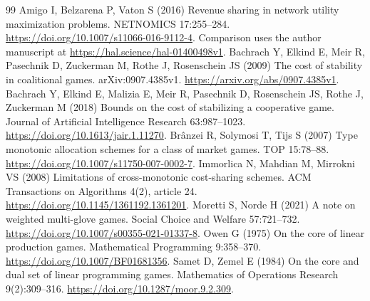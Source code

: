 \documentclass[11pt]{article}
\theoremstyle{definition}\newtheorem{definition}[theorem]{Definition}
\theoremstyle{remark}\newtheorem{remark}[theorem]{Remark}
\begin{document}
\begin{thebibliography}{99}
Amigo I, Belzarena P, Vaton S (2016) Revenue sharing in network utility
maximization problems. NETNOMICS 17:255--284.
\url{https://doi.org/10.1007/s11066-016-9112-4}.
Comparison uses the author manuscript at \url{https://hal.science/hal-01400498v1}.
Bachrach Y, Elkind E, Meir R, Pasechnik D, Zuckerman M, Rothe J,
Rosenschein JS (2009) The cost of stability in coalitional games.
arXiv:0907.4385v1. \url{https://arxiv.org/abs/0907.4385v1}.
Bachrach Y, Elkind E, Malizia E, Meir R, Pasechnik D, Rosenschein JS,
Rothe J, Zuckerman M (2018) Bounds on the cost of stabilizing a cooperative
game. Journal of Artificial Intelligence Research 63:987--1023.
\url{https://doi.org/10.1613/jair.1.11270}.
Br\^anzei R, Solymosi T, Tijs S (2007) Type monotonic allocation schemes
for a class of market games. TOP 15:78--88.
\url{https://doi.org/10.1007/s11750-007-0002-7}.
Immorlica N, Mahdian M, Mirrokni VS (2008) Limitations of cross-monotonic
cost-sharing schemes. ACM Transactions on Algorithms 4(2), article 24.
\url{https://doi.org/10.1145/1361192.1361201}.
Moretti S, Norde H (2021) A note on weighted multi-glove games.
Social Choice and Welfare 57:721--732. \url{https://doi.org/10.1007/s00355-021-01337-8}.
Owen G (1975) On the core of linear production games.
Mathematical Programming 9:358--370.
\url{https://doi.org/10.1007/BF01681356}.
Samet D, Zemel E (1984) On the core and dual set of linear programming games.
Mathematics of Operations Research 9(2):309--316.
\url{https://doi.org/10.1287/moor.9.2.309}.
\end{thebibliography}
\end{document}
